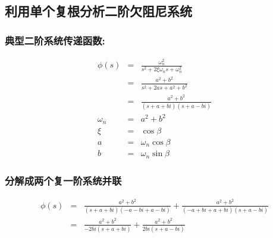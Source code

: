 \documentclass{article}
\begin{document}
\subsection{利用单个复根分析二阶欠阻尼系统}
\label{sec-2-1}
\begin{frame}
\frametitle{典型二阶系统传递函数:}
\label{sec-2-1-1}

\begin{eqnarray*}
\phi(s) &=& \frac{\omega_n^2}{s^2+2\xi\omega_n s+\omega_n^2}\\
&= & \frac{a^2+b^2}{s^2+2a s+a^2+b^2}\\
&=&  \frac{a^2+b^2}{(s+a+bi)(s+a-bi)}\\
\omega_n &=& a^2+b^2 \\
\xi &=& \cos\beta\\
a &=&\omega_n\cos\beta \\
b &=&\omega_n\sin\beta
\end{eqnarray*}
\end{frame}
\begin{frame}
\frametitle{分解成两个复一阶系统并联}
\label{sec-2-1-2}

\begin{eqnarray*}
\phi(s) &=&\frac{a^2+b^2}{(s+a+bi)(-a-bi+a-bi)}+\frac{a^2+b^2}{(-a+bi+a+bi)(s+a-bi)}\\
&=& \frac{a^2+b^2}{-2bi(s+a+bi)}+\frac{a^2+b^2}{2bi(s+a-bi)}
\end{eqnarray*}
\end{frame}
\end{document}
